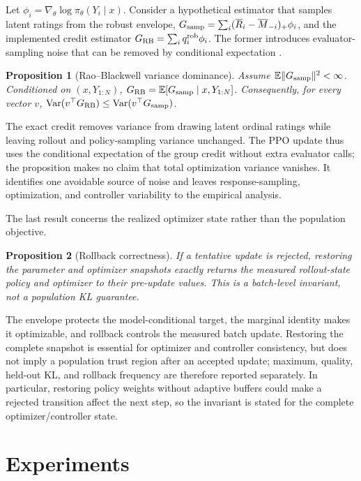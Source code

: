 \documentclass{article}
\newtheorem{proposition}{Proposition}
\theoremstyle{definition}
\theoremstyle{remark}
\begin{document}
Let \(\phi_i=\nabla_\theta\log\pi_\theta(Y_i\mid x)\).  Consider a hypothetical
estimator that samples latent ratings from the robust envelope,
\(G_{\rm samp}=\sum_i(\overline R_i-\overline M_{-i})_+\phi_i\), and the
implemented credit estimator \(G_{\rm RB}=\sum_iq_i^{\rm rob}\phi_i\).  The
former introduces evaluator-sampling noise that can be removed by conditional
expectation \citep{casella1996rao}.

\begin{proposition}[Rao--Blackwell variance dominance]
\label{prop:variance}
Assume \(\mathbb E\|G_{\rm samp}\|^2<\infty\).
Conditioned on \((x,Y_{1:N})\), \(G_{\rm RB}=\mathbb E[G_{\rm samp}\mid
x,Y_{1:N}]\).  Consequently, for every vector \(v\),
\(\operatorname{Var}(v^\top G_{\rm RB})\le
\operatorname{Var}(v^\top G_{\rm samp})\).
\end{proposition}

The exact credit removes variance from drawing latent ordinal ratings while
leaving rollout and policy-sampling variance unchanged.  The PPO update thus
uses the conditional expectation of the group credit without extra evaluator
calls; the proposition makes no claim that total optimization variance vanishes.
It identifies one avoidable source of noise and leaves response-sampling,
optimization, and controller variability to the empirical analysis.

The last result concerns the realized optimizer state rather than the
population objective.
\begin{proposition}[Rollback correctness]
\label{prop:rollback}
If a tentative update is rejected, restoring the parameter and optimizer
snapshots exactly returns the measured rollout-state policy and optimizer to
their pre-update values.  This is a batch-level invariant, not a population KL
guarantee.
\end{proposition}
The envelope protects the model-conditional target, the marginal identity makes
it optimizable, and rollback controls the measured batch update.  Restoring the
complete snapshot is essential for optimizer and controller consistency, but
does not imply a population trust region after an accepted update; maximum,
quality, held-out KL, and rollback frequency are therefore reported separately.
In particular, restoring policy weights without adaptive buffers could make a
rejected transition affect the next step, so the invariant is stated for the
complete optimizer/controller state.

\section{Experiments}
\label{sec:experiments}
\end{document}
